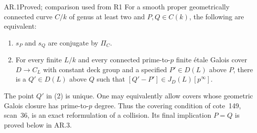 \begin{claim}{AR.1}{Proved; comparison used from R1}
For a smooth proper geometrically connected curve $C/k$ of genus at least
two and $P,Q\in C(k)$, the following are equivalent:
\begin{enumerate}
\item $s_P$ and $s_Q$ are conjugate by $\Pi_C$.
\item For every finite $L/k$ and every connected prime-to-$p$ finite
\'etale Galois cover $D\to C_L$ with constant deck group and a specified
$P'\in D(L)$ above $P$, there is a $Q'\in D(L)$ above $Q$ such that
$[Q'-P']\in J_D(L)[p^\infty]$.
\end{enumerate}
The point $Q'$ in (2) is unique.  One may equivalently allow covers whose
geometric Galois closure has prime-to-$p$ degree.  Thus the covering
condition of cote~149, scan~36, is an exact reformulation of a collision.
Its final implication $P=Q$ is proved below in AR.3.
\end{claim}
